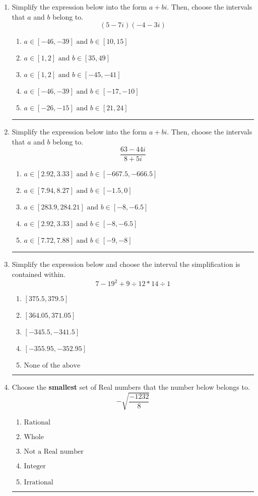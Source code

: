 \documentclass[14pt]{extbook}
\newcommand{\litem}[1]{\item#1\hspace*{-1cm}\rule{\textwidth}{0.4pt}}
\begin{document}
\begin{enumerate}
{\begin{enumerate}[label=\Alph*.]
\end{enumerate} }
\litem{
Simplify the expression below into the form $a+bi$. Then, choose the intervals that $a$ and $b$ belong to.\[ (5 - 7 i)(-4 - 3 i) \]\begin{enumerate}[label=\Alph*.]
\item \( a \in [-46, -39] \text{ and } b \in [10, 15] \)
\item \( a \in [1, 2] \text{ and } b \in [35, 49] \)
\item \( a \in [1, 2] \text{ and } b \in [-45, -41] \)
\item \( a \in [-46, -39] \text{ and } b \in [-17, -10] \)
\item \( a \in [-26, -15] \text{ and } b \in [21, 24] \)

\end{enumerate} }
\litem{
Simplify the expression below into the form $a+bi$. Then, choose the intervals that $a$ and $b$ belong to.\[ \frac{63 - 44 i}{8 + 5 i} \]\begin{enumerate}[label=\Alph*.]
\item \( a \in [2.92, 3.33] \text{ and } b \in [-667.5, -666.5] \)
\item \( a \in [7.94, 8.27] \text{ and } b \in [-1.5, 0] \)
\item \( a \in [283.9, 284.21] \text{ and } b \in [-8, -6.5] \)
\item \( a \in [2.92, 3.33] \text{ and } b \in [-8, -6.5] \)
\item \( a \in [7.72, 7.88] \text{ and } b \in [-9, -8] \)

\end{enumerate} }
\litem{
Simplify the expression below and choose the interval the simplification is contained within.\[ 7 - 19^2 + 9 \div 12 * 14 \div 1 \]\begin{enumerate}[label=\Alph*.]
\item \( [375.5, 379.5] \)
\item \( [364.05, 371.05] \)
\item \( [-345.5, -341.5] \)
\item \( [-355.95, -352.95] \)
\item \( \text{None of the above} \)

\end{enumerate} }
\litem{
Choose the \textbf{smallest} set of Real numbers that the number below belongs to.\[ -\sqrt{\frac{-1232}{8}} \]\begin{enumerate}[label=\Alph*.]
\item \( \text{Rational} \)
\item \( \text{Whole} \)
\item \( \text{Not a Real number} \)
\item \( \text{Integer} \)
\item \( \text{Irrational} \)


\end{enumerate}}
\end{enumerate}
\end{document}
